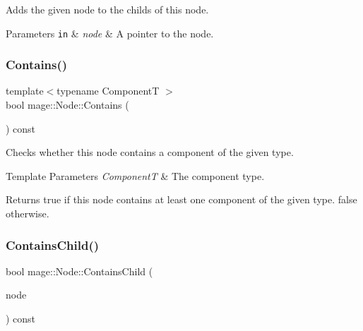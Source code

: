 Adds the given node to the childs of this node.


\begin{DoxyParams}[1]{Parameters}
\mbox{\tt in}  & {\em node} & A pointer to the node. \\
\hline
\end{DoxyParams}
\hypertarget{classmage_1_1_node_ab3defd7329e8f87cff65cd8136c8f2d2}{}\label{classmage_1_1_node_ab3defd7329e8f87cff65cd8136c8f2d2} 
\subsubsection{\texorpdfstring{Contains()}{Contains()}}
{\footnotesize\ttfamily template$<$typename ComponentT $>$ \\
bool mage\+::\+Node\+::\+Contains (\begin{DoxyParamCaption}{ }\end{DoxyParamCaption}) const\hspace{0.3cm}{\ttfamily [noexcept]}}

Checks whether this node contains a component of the given type.


\begin{DoxyTemplParams}{Template Parameters}
{\em ComponentT} & The component type. \\
\hline
\end{DoxyTemplParams}
\begin{DoxyReturn}{Returns}
{\ttfamily true} if this node contains at least one component of the given type. {\ttfamily false} otherwise. 
\end{DoxyReturn}
\hypertarget{classmage_1_1_node_a2c1d85609b765c019a0a123f5f8a182a}{}\label{classmage_1_1_node_a2c1d85609b765c019a0a123f5f8a182a} 
\subsubsection{\texorpdfstring{Contains\+Child()}{ContainsChild()}}
{\footnotesize\ttfamily bool mage\+::\+Node\+::\+Contains\+Child (\begin{DoxyParamCaption}\item[{\hyperlink{classmage_1_1_proxy_ptr}{Proxy\+Ptr}$<$ const \hyperlink{classmage_1_1_node}{Node} $>$}]{node }\end{DoxyParamCaption}) const}

